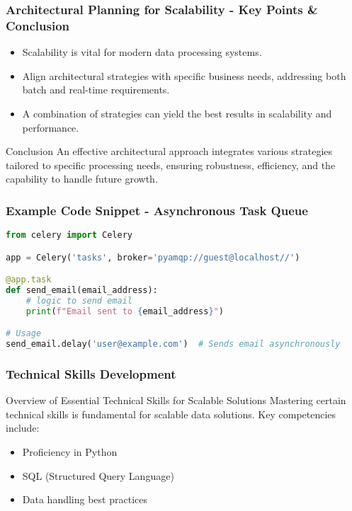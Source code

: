 \documentclass[aspectratio=169]{beamer}
\begin{document}
\begin{frame}[fragile]
    \frametitle{Architectural Planning for Scalability - Key Points & Conclusion}
    \begin{itemize}
        \item Scalability is vital for modern data processing systems.
        \item Align architectural strategies with specific business needs, addressing both batch and real-time requirements.
        \item A combination of strategies can yield the best results in scalability and performance.
    \end{itemize}
    
    \begin{block}{Conclusion}
        An effective architectural approach integrates various strategies tailored to specific processing needs, ensuring robustness, efficiency, and the capability to handle future growth.
    \end{block}
\end{frame}

\begin{frame}[fragile]
    \frametitle{Example Code Snippet - Asynchronous Task Queue}
    \begin{lstlisting}[language=Python]
from celery import Celery

app = Celery('tasks', broker='pyamqp://guest@localhost//')

@app.task
def send_email(email_address):
    # logic to send email
    print(f"Email sent to {email_address}")

# Usage
send_email.delay('user@example.com')  # Sends email asynchronously
    \end{lstlisting}
\end{frame}

\begin{frame}
  \frametitle{Technical Skills Development}
  \begin{block}{Overview of Essential Technical Skills for Scalable Solutions}
    Mastering certain technical skills is fundamental for scalable data solutions. Key competencies include:
  \end{block}
  \begin{itemize}
    \item Proficiency in Python
    \item SQL (Structured Query Language)
    \item Data handling best practices
  \end{itemize}
\end{frame}
\end{document}
